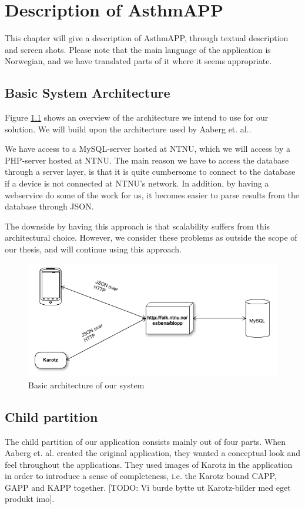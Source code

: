 \chapter{Description of AsthmAPP}
\label{chp:description}

This chapter will give a description of AsthmAPP, through textual description and screen shots. Please note that the main language of the application is Norwegian, and we have translated parts of it where it seems appropriate. 

\section{Basic System Architecture}
\label{sec:architecture}
Figure \ref{fig:basic-architecture} shows an overview of the architecture we intend to use for our solution. We will build upon the architecture used by Aaberg et. al.\cite{CustomerDriven}.

We have access to a MySQL-server hosted at NTNU, which we will access by a PHP-server hosted at NTNU. The main reason we have to access the database through a server layer, is that it is quite cumbersome to connect to the database if a device is not connected at NTNU's network. In addition, by having a webservice do some of the work for us, it becomes easier to parse results from the database through JSON.   


The downside by having this approach is that scalability suffers from this architectural choice. However, we consider these problems as outside the scope of our thesis, and will continue using this approach.

\begin{figure}
		\centering
			\includegraphics[width=0.50\paperwidth]{Pictures/basic-architecture.png}
		\caption{Basic architecture of our system}
		\label{fig:basic-architecture}
\end{figure}

\section{Child partition}
\label{sec:description-child-partition}
The child partition of our application consists mainly out of four parts. When Aaberg et. al. created the original application, they wanted a conceptual look and feel throughout the applications. They used images of Karotz in the application in order to introduce a sense of completeness, i.e. the Karotz bound CAPP, GAPP and KAPP together. [TODO: Vi burde bytte ut Karotz-bilder med eget produkt imo]. 


